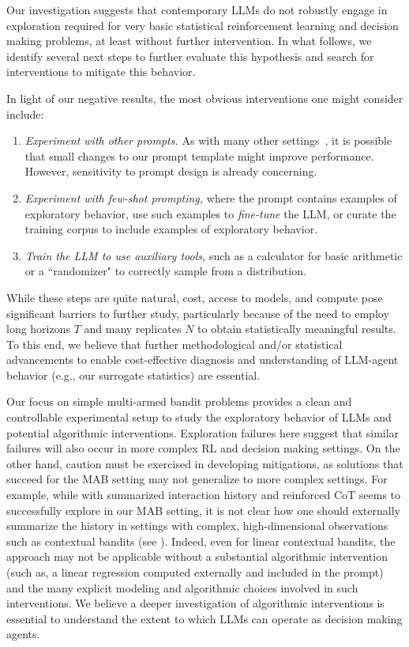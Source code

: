 Our investigation suggests that contemporary LLMs do not
robustly engage in exploration required for very basic
statistical reinforcement learning and decision making problems, at least without further
intervention. In what follows, we identify several next steps to further evaluate this
hypothesis and search for interventions to mitigate this behavior.

In light of our negative results, the most obvious interventions one might consider include:
\begin{enumerate}
\setlength{\itemsep}{0pt}
\item \emph{Experiment with other prompts.} As with many other settings~\citep{sclar2023quantifying}, it is possible that small changes to our prompt template might improve performance. However, sensitivity to prompt design is already concerning.
\item \emph{Experiment with few-shot prompting,} where the prompt contains examples of exploratory behavior, use such examples to \emph{fine-tune} the LLM, or curate the training corpus to include examples of exploratory behavior.
\item \emph{Train the LLM to use auxiliary tools,} such as a calculator for basic arithmetic or a ``randomizer" to correctly sample from a distribution.
\end{enumerate}
While these steps are quite natural, cost, access to models, and compute pose significant barriers to further study, particularly because of the need to employ long horizons $T$ and many replicates $N$ to obtain statistically meaningful results.
To this end, we believe that further methodological and/or statistical advancements to enable cost-effective diagnosis and understanding of LLM-agent behavior (e.g., our surrogate statistics) are essential.


Our focus on simple multi-armed bandit problems provides a clean and controllable
experimental setup to study the exploratory behavior of LLMs and
potential algorithmic interventions. Exploration failures here suggest
that similar failures will also occur in more complex RL and decision making settings. On the other hand, caution must be exercised in developing mitigations, as solutions that succeed for the MAB setting may not generalize to more complex settings.
For example, while \gptfour
with summarized interaction history and reinforced CoT seems to successfully
explore in our MAB setting, it is not clear how one should externally summarize the history in settings with complex, high-dimensional observations such as contextual bandits (see ). Indeed, even for linear contextual bandits, the  approach may not be applicable without a substantial algorithmic intervention (such as, \eg a linear regression computed externally and included in the prompt)
and the many explicit modeling and algorithmic choices involved in such interventions. 
We believe a deeper investigation of algorithmic interventions is essential to understand the extent to which LLMs can operate as decision making agents.



